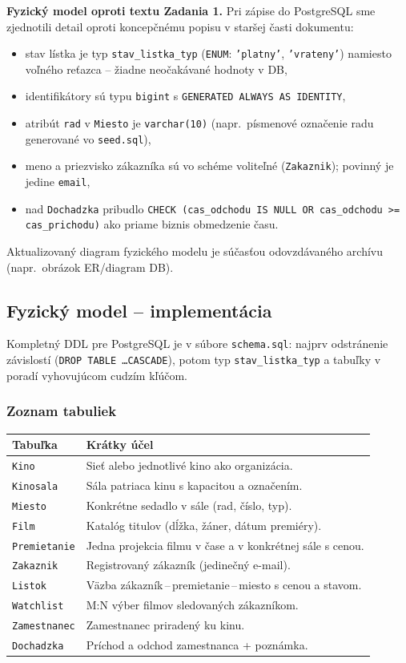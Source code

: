 \documentclass[11pt, a4paper]{article}
\begin{document}
\textbf{Fyzický model oproti textu Zadania 1.}
Pri zápise do PostgreSQL sme zjednotili detail oproti koncepčnému popisu v staršej časti dokumentu:
\begin{itemize}
    \item stav lístka je typ \texttt{stav\_listka\_typ} (\texttt{ENUM}: \texttt{'platny'}, \texttt{'vrateny'}) namiesto voľného reťazca -- žiadne neočakávané hodnoty v DB,
    \item identifikátory sú typu \texttt{bigint} s \texttt{GENERATED ALWAYS AS IDENTITY},
    \item atribút \texttt{rad} v \texttt{Miesto} je \texttt{varchar(10)} (napr.\ písmenové označenie radu generované vo \texttt{seed.sql}),
    \item meno a priezvisko zákazníka sú vo schéme voliteľné (\texttt{Zakaznik}); povinný je jedine \texttt{email},
    \item nad \texttt{Dochadzka} pribudlo \texttt{CHECK (cas\_odchodu IS NULL OR cas\_odchodu >= cas\_prichodu)} ako priame biznis obmedzenie času.
\end{itemize}
Aktualizovaný diagram fyzického modelu je súčasťou odovzdávaného archívu (napr.\ obrázok ER/diagram DB).

\subsection{Fyzický model -- implementácia}

Kompletný DDL pre PostgreSQL je v súbore \texttt{schema.sql}: najprv odstránenie závislostí (\texttt{DROP TABLE \ldots CASCADE}), potom typ \texttt{stav\_listka\_typ} a tabuľky v poradí vyhovujúcom cudzím kľúčom.

\subsubsection*{Zoznam tabuliek}
\begin{tabular}{@{}p{}p{}@{}}
    \toprule
    Tabuľka & Krátky účel \\
    \midrule
    \texttt{Kino} & Sieť alebo jednotlivé kino ako organizácia. \\
    \texttt{Kinosala} & Sála patriaca kinu s kapacitou a označením. \\
    \texttt{Miesto} & Konkrétne sedadlo v sále (rad, číslo, typ). \\
    \texttt{Film} & Katalóg titulov (dĺžka, žáner, dátum premiéry). \\
    \texttt{Premietanie} & Jedna projekcia filmu v čase a v konkrétnej sále s cenou. \\
    \texttt{Zakaznik} & Registrovaný zákazník (jedinečný e-mail). \\
    \texttt{Listok} & Väzba zákazník\,--\,premietanie\,--\,miesto s cenou a stavom. \\
    \texttt{Watchlist} & M:N výber filmov sledovaných zákazníkom. \\
    \texttt{Zamestnanec} & Zamestnanec priradený ku kinu. \\
    \texttt{Dochadzka} & Príchod a odchod zamestnanca + poznámka. \\
    \bottomrule
\end{tabular}
\end{document}

